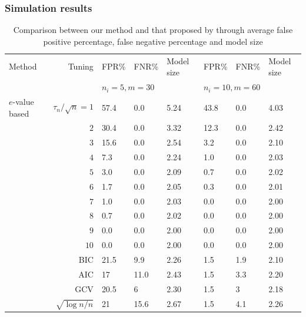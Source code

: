 \documentclass[handout,10pt]{beamer}
\begin{document}
\begin{frame}
\frametitle{Simulation results}

\begin{table}[t]
	\centering
	\begin{scriptsize}
   \begin{tabular}{lr|lll|lll}
    \hline
    Method      & Tuning     & FPR\% & FNR\% & Model size & FPR\% & FNR\% & Model size \\ \cline{3-8}
    ~ & ~ & \multicolumn{3}{l|}{$n_i=5,m=30$} & \multicolumn{3}{l}{$n_i=10,m=60$}\\ \hline
  $e$-value based       & $\tau_n / \sqrt n = 1$      & 57.4     & 0.0   & 5.24       & 43.8     & 0.0   & 4.03       \\
    ~      & $2$      & 30.4     & 0.0   & 3.32       & 12.3     & 0.0   & 2.42       \\
    ~      & $3$      & 15.6     & 0.0   & 2.54       & 3.2      & 0.0   & 2.10       \\
    ~      & $4$      & 7.3      & 0.0   & 2.24       & 1.0      & 0.0   & 2.03       \\
    ~      & $5$      & 3.0     & 0.0   & 2.09       & 0.7   & 0.0   & 2.02       \\
    ~      & $6$      & 1.7     & 0.0   & 2.05       & 0.3   & 0.0   & 2.01       \\
    ~      & $7$      & 1.0   & 0.0   & 2.03       & 0.0   & 0.0   & 2.00       \\
    ~      & $8$      & 0.7   & 0.0   & 2.02       & 0.0   & 0.0   & 2.00       \\
    ~      & $9$      & 0.0   & 0.0   & 2.00       & 0.0   & 0.0   & 2.00       \\
    ~      & $10$      & 0.0   & 0.0   & 2.00       & 0.0   & 0.0   & 2.00       \\
     \hline
    \cite{PengLu12} & BIC    & 21.5  & 9.9   & 2.26       & 1.5   & 1.9   & 2.10       \\
    ~      & AIC    & 17    & 11.0  & 2.43       & 1.5   & 3.3   & 2.20       \\
    ~      & GCV    & 20.5  & 6     & 2.30       & 1.5   & 3     & 2.18       \\
    ~      & $\sqrt{\log n/n}$ & 21    & 15.6  & 2.67       & 1.5   & 4.1   & 2.26       \\ \hline
    \end{tabular}
    \caption*{Comparison between our method and that proposed by \cite{PengLu12} through average false positive percentage, false negative percentage and model size}
    \label{table:simtable1}
    \end{scriptsize}
\end{table}
%

\end{frame}
\end{document}
